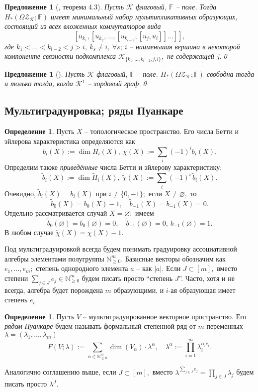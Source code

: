 \documentclass[10pt,a4paper]{article}
\def\FF{\mathbb{F}}
\def\NN{\mathbb{N}}
\def\Nm{\NN_{\geq 0}^m}
\def\Z{\mathcal{Z}}
\def\K{\mathcal{K}}
\def\ZK{\Z_\K}
\def\OZK{\Omega\ZK}
\newtheorem{prp}[thm]{Предложение}
\theoremstyle{definition}
\newtheorem{dfn}[thm]{Определение}
\begin{document}
\begin{prp}[\cite{gptw}, теорема 4.3]
Пусть $\mathcal{K}$ флаговый, $\FF$ -- поле. Тогда $H_*(\OZK;\mathbb{F})$ имеет минимальный набор мультипликативных образующих, состоящий из всех вложенных коммутаторов вида
$$[u_{k_1},[u_{k_2},\dots,[u_{k_{l-2}},[u_j,u_i]]\dots]],$$
где $k_1<\dots<k_{l-2}<j>i,~k_s\neq i,~\forall s;~i$ -- наименьшая вершина в некоторой компоненте связности подкомплекса $\K_{\{k_1,\dots,k_{l-2},j,i\}},$ не содержащей $j.$\qed
\end{prp}
\begin{prp}[\cite{gptw}]
Пусть $\K$ флаговый, $\FF$ -- поле. $H_*(\OZK;\mathbb{F})$ свободна тогда и только тогда, когда $\K^1$ -- хордовый граф.\qed
\end{prp}
\subsection{Мультиградуировка; ряды Пуанкаре}
\begin{dfn}
Пусть $X$ -- топологическое пространство. Его числа Бетти и эйлерова характеристика определяются как
$$b_i(X):=\dim H_i(X),~\chi(X):=\sum_{i} (-1)^i b_i(X).$$
Определим также \emph{приведённые} числа Бетти и эйлерову характеристику:
$$\widetilde{b}_i(X):=\dim\widetilde{H}_i(X),~\widetilde{\chi}(X):=\sum_{i}(-1)^i\,\widetilde{b}_i(X).$$
Очевидно, $\widetilde{b}_i(X)=b_i(X)$ при $i\neq \{0,-1\};$ если $X\neq\varnothing,$ то $$\widetilde{b}_0(X)=b_0(X)-1,\quad\widetilde{b}_{-1}(X)=b_{-1}(X)=0.$$
Отдельно рассматривается случай $X=\varnothing:$ имеем $$\widetilde{b}_0(\varnothing)=b_0(\varnothing)=0,\quad\widetilde{b}_{-1}(\varnothing)=0,~b_{-1}(\varnothing)=1.$$
В любом случае $\widetilde{\chi}(X)=\chi(X)-1.$
\end{dfn}

Под мультиградуировкой всегда будем понимать градуировку ассоциативной алгебры элементами полугруппы $\mathbb{N}_{\geq 0}^m.$ Базисные векторы обозначим как $e_1,\dots,e_m;$ степень однородного элемента $a$ -- как $|a|.$ Если $J\subset[m],$ вместо степени $\sum_{j\in J}e_j\in\Nm$ будем писать просто ``степень $J$''. Часто, хотя и не всегда, алгебра будет порождена $m$ образующими, и $i$-ая образующая имеет степень $e_i.$
\begin{dfn}
Пусть $V$ -- мультиградуированное векторное пространство. Его \emph{рядом Пуанкаре} будем называть формальный степенной ряд от $m$ переменных $\lambda=(\lambda_1,\dots,\lambda_m)$
$$F(V;\lambda):=\sum_{\alpha\in \mathbb{N}_{\geq 0}^m} \dim(V_\alpha)\cdot \lambda^\alpha,\quad\lambda^\alpha:=\prod_{i=1}^m \lambda_i^{\alpha_ie_i}.$$
\end{dfn}
Аналогично соглашению выше, если $J\subset[m],$ вместо $\lambda^{\sum_{j\in J}e_j}=\prod_{j\in J}\lambda_j$ будем писать просто $\lambda^J.$
\end{document}
